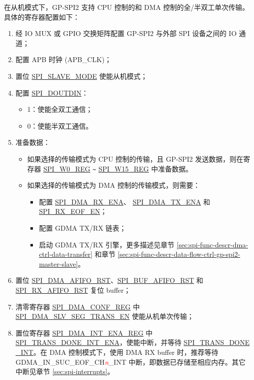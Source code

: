 \documentclass[main\_\_CN.tex]{subfiles}
\begin{document}
在从机模式下，GP-SPI2 支持 CPU 控制的和 DMA 控制的全/半双工单次传输。具体的寄存器配置如下：
\begin{enumerate}
    \item 经 IO MUX 或 GPIO 交换矩阵配置 GP-SPI2 与外部 SPI 设备之间的 IO 通道；

    \item 配置 APB 时钟 (APB\_CLK)；

    \item 置位 \hyperref[fielddesc:SPISLAVEMODE]{SPI\_SLAVE\_MODE} 使能从机模式；

    \item 配置 \hyperref[fielddesc:SPIDOUTDIN]{SPI\_DOUTDIN}：
    \begin{itemize}
        \item 1：使能全双工通信；
        \item 0：使能半双工通信。
    \end{itemize}

    \item 准备数据：
    \begin{itemize}
        \item 如果选择的传输模式为 CPU 控制的传输，且 GP-SPI2 发送数据，则在寄存器 \hyperref[regdesc:SPIW0REG]{SPI\_W0\_REG} \verb+~+ \hyperref[regdesc:SPIW15REG]{SPI\_W15\_REG} 中准备数据。
        \item 如果选择的传输模式为 DMA 控制的传输模式，则需要：
        \begin{itemize}
            \item 配置 \hyperref[fielddesc:SPIDMARXENA]{SPI\_DMA\_RX\_ENA}、 \hyperref[fielddesc:SPIDMATXENA]{SPI\_DMA\_TX\_ENA} 和 \hyperref[fielddesc:SPIRXEOFEN]{SPI\_RX\_EOF\_EN}；
            \item 配置 GDMA TX/RX 链表；
            \item 启动 GDMA TX/RX 引擎，更多描述见章节  \ref{sec:spi-func-descr-dma-ctrl-data-transfer} 和章节  \ref{sec:spi-func-descr-data-flow-ctrl-gp-spi2-master-slave}。
        \end{itemize}
    \end{itemize}

    \item 置位 \hyperref[fielddesc:SPIDMAAFIFORST]{SPI\_DMA\_AFIFO\_RST}、\hyperref[fielddesc:SPIBUFAFIFORST]{SPI\_BUF\_AFIFO\_RST} 和 \hyperref[fielddesc:SPIRXAFIFORST]{SPI\_RX\_AFIFO\_RST} 复位 buffer；

    \item 清零寄存器 \hyperref[regdesc:SPIDMACONFREG]{SPI\_DMA\_CONF\_REG} 中 \hyperref[fielddesc:SPIDMASLVSEGTRANSEN]{SPI\_DMA\_SLV\_SEG\_TRANS\_EN} 使能从机单次传输；

    \item 置位寄存器 \hyperref[regdesc:SPIDMAINTENAREG]{SPI\_DMA\_INT\_ENA\_REG} 中 \hyperref[fielddesc:SPITRANSDONEINTENA]{SPI\_TRANS\_DONE\_INT\_ENA}，使能中断，并等待 \hyperref[int:SPITRANSDONEINT]{SPI\_TRANS\_DONE\\\_INT}。在 DMA 控制模式下，使用 DMA RX buffer 时，推荐等待 GDMA\_IN\_SUC\_EOF\_CH\textcolor{red}{\it{n}}\_INT 中断，即数据已存储至相应内存。其它中断见章节 \ref{sec:spi-interrupts}。
\end{enumerate}
\end{document}
